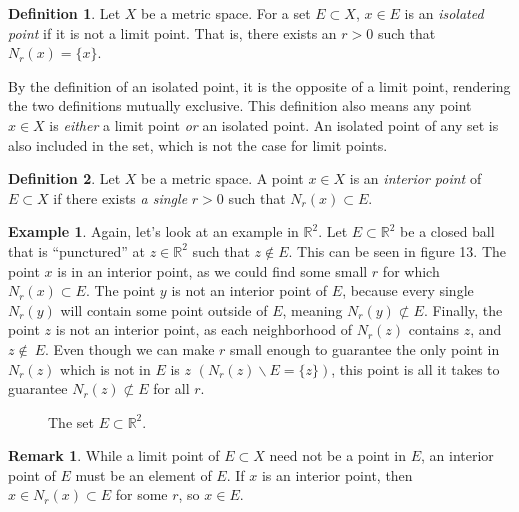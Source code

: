 \documentclass{article}
\newcommand{\R}{\mathbb{R}}
\theoremstyle{definition}
\newtheorem{definition}{Definition}[section]
\newtheorem{example}{Example}[section]
\newtheorem{remark}{Remark}[section]
\begin{document}
\begin{definition}
		Let $ X $ be a metric space. For a set $ E\subset X $, $ x\in E $ is an \textit{\color{red}isolated point} if it is not a limit point. That is, there exists an $ r>0 $ such that $ N_r(x)=\{x\} $. 
\end{definition}
By the definition of an isolated point, it is the opposite of a limit point, rendering the two definitions mutually exclusive. This definition also means any point $ x\in X $ is \textit{either} a limit point \textit{or} an isolated point.  An isolated point of any set is also included in the set, which is not the case for limit points. 
\begin{definition}
Let $ X $ be a metric space. A point $ x\in X$ is an \textit{\color{red}interior point} of $ E\subset X $ if there exists \textit{a single} $ r>0 $ such that $ N_r(x)\subset E $. 
\end{definition}
\begin{example}
	Again, let's look at an example in $ \R^2 $. Let $ E\subset \R^2 $ be a closed ball that is ``punctured'' at $ z\in\R^2 $ such that $ z\notin E$. This can be seen in figure 13. The point $ x $ is in an interior point, as we could find some small $ r $ for which $ N_r(x)\subset E $. The point $ y $ is not an interior point of $ E $, because every single $ N_r(y) $ will contain some point outside of $ E $, meaning $ N_r(y)\not\subset E $. Finally, the point $ z $ is not an interior point, as each neighborhood of $ N_r(z) $ contains $ z $, and $ z\notin\ E $. Even though we can make $ r $ small enough to guarantee the only point in $ N_r(z) $ which is not in $ E $ is $ z $ $ (N_r(z)\backslash E=\{z\}) $, this point is all it takes to guarantee $ N_r(z)\not\subset E $ for all $ r $. 
\begin{figure}[h]
	\centering
	\caption{The set $ E\subset \R^2 $.}
\end{figure}	
\end{example}
\begin{remark}
	While a limit point of $ E\subset X $ need not be a point in $ E $, an interior point of $ E $ must be an element of $ E $. If $ x $ is an interior point, then $ x\in N_r(x)\subset E $ for some $ r $, so $ x\in E $. 
\end{remark}
\end{document}
